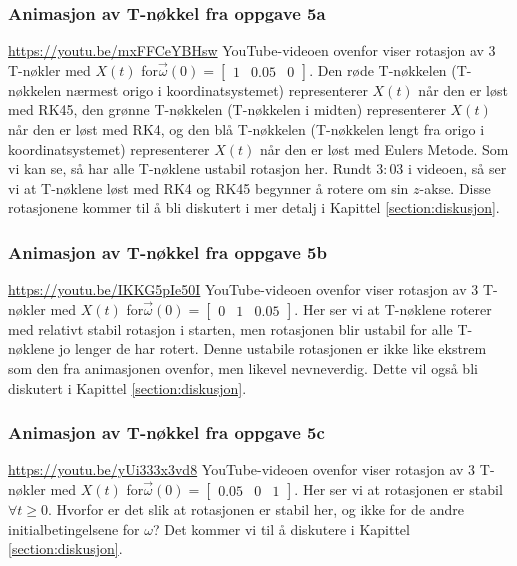 \subsubsection{Animasjon av T-nøkkel fra oppgave 5a}
\href{https://youtu.be/mxFFCeYBHsw}{https://youtu.be/mxFFCeYBHsw}\newline\newline 
YouTube-videoen ovenfor viser rotasjon av $3$ T-nøkler med $X(t)$ for\newline $\vec{\omega}(0)=\begin{bmatrix}1&0.05&0\end{bmatrix}.$ Den røde T-nøkkelen (T-nøkkelen nærmest origo i koordinatsystemet) representerer $X(t)$ når den er løst med RK45, den grønne T-nøkkelen (T-nøkkelen i midten) representerer $X(t)$ når den er løst med RK4, og den blå T-nøkkelen (T-nøkkelen lengt fra origo i koordinatsystemet) representerer $X(t)$ når den er løst med Eulers Metode. Som vi kan se, så har alle T-nøklene ustabil rotasjon her. Rundt $3:03$ i videoen, så ser vi at T-nøklene løst med RK4 og RK45 begynner å rotere om sin $z$-akse. Disse rotasjonene kommer til å bli diskutert i mer detalj i Kapittel \ref{section:diskusjon}.

\subsubsection{Animasjon av T-nøkkel fra oppgave 5b}
\href{https://youtu.be/IKKG5pIe50I}{https://youtu.be/IKKG5pIe50I}\newline\newline
YouTube-videoen ovenfor viser rotasjon av $3$ T-nøkler med $X(t)$ for\newline $\vec{\omega}(0) = \begin{bmatrix}0 & 1 & 0.05 \end{bmatrix}$. Her ser vi at T-nøklene roterer med relativt stabil rotasjon i starten, men rotasjonen blir ustabil for alle T-nøklene jo lenger de har rotert. Denne ustabile rotasjonen er ikke like ekstrem som den fra animasjonen ovenfor, men likevel nevneverdig. Dette vil også bli diskutert i Kapittel \ref{section:diskusjon}.

\subsubsection{Animasjon av T-nøkkel fra oppgave 5c}
\href{https://youtu.be/yUi333x3vd8}{https://youtu.be/yUi333x3vd8}\newline\newline
YouTube-videoen ovenfor viser rotasjon av $3$ T-nøkler med $X(t)$ for\newline $\vec{\omega}(0) = \begin{bmatrix}0.05 & 0 & 1 \end{bmatrix}$. Her ser vi at rotasjonen er stabil $\forall t\geq 0.$ Hvorfor er det slik at rotasjonen er stabil her, og ikke for de andre initialbetingelsene for $\omega$? Det kommer vi til å diskutere i Kapittel \ref{section:diskusjon}.